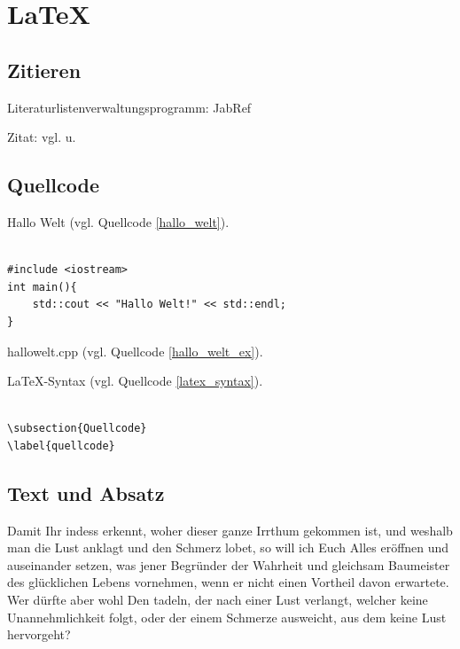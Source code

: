 \section{\LaTeX}
\label{latex}

\subsection{Zitieren}
\label{zitieren}

Literaturlistenverwaltungsprogramm: JabRef 


Zitat: vgl. \cite{monk_action_buch:2016} u. \cite{kofler_linux:2017} 

\subsection{Quellcode}
\label{quellcode}

Hallo Welt (vgl. Quellcode \ref{hallo_welt}).
\begin{lstlisting}[caption={Hallo Welt},label={hallo_welt},language=C++% C, TeX, Bash, Python
]%--Code einfügen--%

#include <iostream>
int main(){
	std::cout << "Hallo Welt!" << std::endl;
}
\end{lstlisting}

hallowelt.cpp (vgl. Quellcode \ref{hallo_welt_ex}).


\LaTeX -Syntax (vgl. Quellcode \ref{latex_syntax}). 
\begin{lstlisting}[caption={\LaTeX-Syntax},label={latex_syntax},language=TeX% C, TeX, Bash, Python
]%--Code einfügen--%

\subsection{Quellcode}
\label{quellcode}
\end{lstlisting}


\subsection{Text und Absatz}
\label{text_absatz}
Damit Ihr indess erkennt, woher dieser ganze Irrthum gekommen ist, und weshalb man die Lust anklagt und den Schmerz lobet, so will ich Euch Alles eröffnen und auseinander setzen, was jener Begründer der Wahrheit und gleichsam Baumeister des glücklichen Lebens  vornehmen, wenn er nicht einen Vortheil davon erwartete. Wer dürfte aber wohl Den tadeln, der nach einer Lust verlangt, welcher keine Unannehmlichkeit folgt, oder der einem Schmerze ausweicht, aus dem keine Lust hervorgeht?

